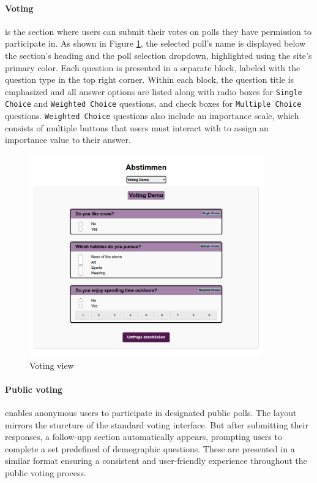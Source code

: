 \documentclass[a4paper,12pt]{report}
\begin{document}
\paragraph{Voting} is the section where users can submit their votes on polls they have permission to participate in. As shown in Figure \ref{fig:voting_view}, the selected poll's name is displayed below the section's heading and the poll selection dropdown, highlighted using the site's primary color. Each question is presented in a separate block, labeled with the question type in the top right corner. Within each block, the question title is emphasized and all answer options are listed along with radio boxes for \texttt{Single Choice} and \texttt{Weighted Choice} questions, and check boxes for \texttt{Multiple Choice} questions. \texttt{Weighted Choice} questions also include an importance scale, which consists of multiple buttons that users must interact with to assign an importance value to their answer.
\begin{figure}[H]
	\centering
	\includegraphics[width=0.9\textwidth]{pics/voting_view.png}
	\caption{Voting view}
	\label{fig:voting_view}
\end{figure}
\paragraph{Public voting} enables anonymous users to participate in designated public polls. The layout mirrors the sturcture of the standard voting interface. But after submitting their responses, a follow-upp section automatically appears, prompting users to complete a set predefined of demographic questions. These are presented in a similar format ensuring a consistent and user-friendly experience throughout the public voting process.\\\\
\end{document}
